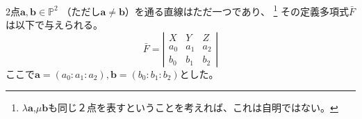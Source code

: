 \documentclass[a4]{article}
\newcommand{\proj}{\mathbb{P}}
\begin{document}
        \begin{Prop}
            2点$\mathbf{a}, \mathbf{b} \in \proj^2$
            （ただし$\mathbf{a} \neq \mathbf{b}$）を通る直線はただ一つであり、
            \footnote{$\lambda \mathbf{a}$,$\mu \mathbf{b}$も同じ２点を表すということを考えれば、これは自明ではない。}
            その定義多項式$\bar{F}$は以下で与えられる。
            \[
            \bar{F}=
              \left|
                  \begin{array}{ccc}
                      X & Y & Z \\
                      a_0 & a_1 & a_2 \\
                      b_0 & b_1 & b_2
                  \end{array}
              \right|
            \]
            ここで$\mathbf{a}=(a_0 : a_1 : a_2), \mathbf{b}=(b_0 : b_1 : b_2)$とした。
        \end{Prop}
\end{document}
